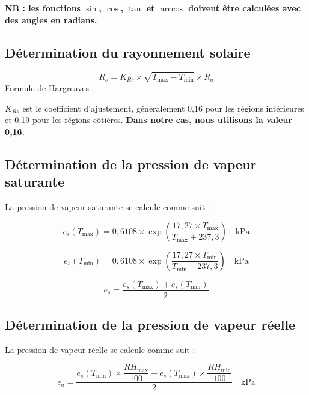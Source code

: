 \noindent \textbf{NB : les fonctions $\sin$, $\cos$, $\tan$ et $\arccos$ doivent être calculées avec des angles en radians.}

\subsection{Détermination du rayonnement solaire}

\begin{equation}
    R_s = K_{Rs} \times \sqrt{T_{\max} - T_{\min}} \times R_a
    \label{eq:rs_hargreaves}
\end{equation}
\noindent Formule de Hargreaves \cite{allen_crop_1998-1,koc_reference_2023}.

$K_{Rs}$ est le coefficient d'ajustement, généralement 0,16 pour les régions intérieures et 0,19 pour les régions côtières. \textbf{Dans notre cas, nous utilisons la valeur 0,16.}

\subsection{Détermination de la pression de vapeur saturante}

La pression de vapeur saturante se calcule comme suit \cite[chap.~3]{allen_crop_1998-1} :

\begin{equation}
    e_s(T_{\max}) = 0{,}6108 \times \exp\left(\frac{17{,}27 \times T_{\max}}{T_{\max} + 237{,}3}\right) \quad \text{kPa}
    \label{eq:es_tmax}
\end{equation}

\begin{equation}
    e_s(T_{\min}) = 0{,}6108 \times \exp\left(\frac{17{,}27 \times T_{\min}}{T_{\min} + 237{,}3}\right) \quad \text{kPa}
    \label{eq:es_tmin}
\end{equation}

\begin{equation}
    e_s = \frac{e_s(T_{\max}) + e_s(T_{\min})}{2}
    \label{eq:es_moy}
\end{equation}

\subsection{Détermination de la pression de vapeur réelle}

La pression de vapeur réelle se calcule comme suit \cite[chap.~3]{allen_crop_1998-1} :

\begin{equation}
    e_a = \frac{e_s(T_{\min}) \times \dfrac{RH_{\max}}{100} + e_s(T_{\max}) \times \dfrac{RH_{\min}}{100}}{2} \quad \text{kPa}
    \label{eq:ea}
\end{equation}

